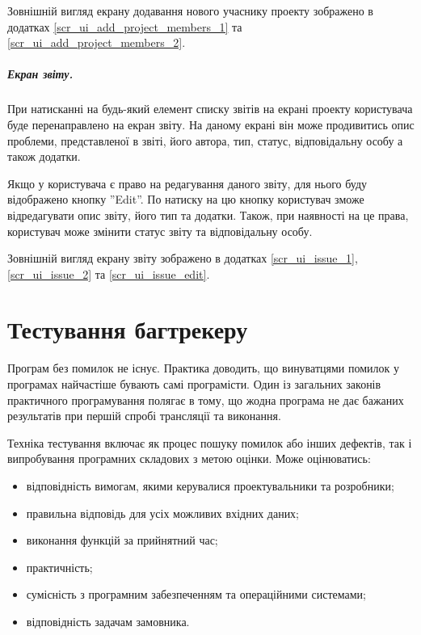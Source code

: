 \documentclass[../main.tex]{subfiles}
\begin{document}
			Зовнішній вигляд екрану додавання нового учаснику проекту зображено в додатках \ref{scr_ui_add_project_members_1} та \ref{scr_ui_add_project_members_2}.
	
		\subparagraph{Екран звіту.}
		
			При натисканні на будь-який елемент списку звітів на екрані проекту користувача буде перенаправлено на екран звіту. На даному екрані він може продивитись опис проблеми, представленої в звіті, його автора, тип, статус, відповідальну особу а також додатки.
			
			Якщо у користувача є право на редагування даного звіту, для нього буду відображено кнопку ''Edit''. По натиску на цю кнопку користувач зможе відредагувати опис звіту, його тип та додатки. Також, при наявності на це права, користувач може змінити статус звіту та відповідальну особу.
			
			Зовнішній вигляд екрану звіту зображено в додатках \ref{scr_ui_issue_1}, \ref{scr_ui_issue_2} та \ref{scr_ui_issue_edit}.


\section{Тестування багтрекеру}

	Програм без помилок не існує. Практика доводить, що винуватцями помилок у програмах найчастіше бувають самі програмісти. Один із загальних законів практичного програмування полягає в тому, що жодна програма не дає бажаних результатів при першій спробі трансляції та виконання.~\cite{fast_testing}
	
	Техніка тестування включає як процес пошуку помилок або інших дефектів, так і випробування програмних складових з метою оцінки. Може оцінюватись:
	\begin{itemize}
		\item відповідність вимогам, якими керувалися проектувальники та розробники;
		\item правильна відповідь для усіх можливих вхідних даних;
		\item виконання функцій за прийнятний час;
		\item практичність;
		\item сумісність з програмним забезпеченням та операційними системами;
		\item відповідність задачам замовника.
	\end{itemize}
	
\end{document}
